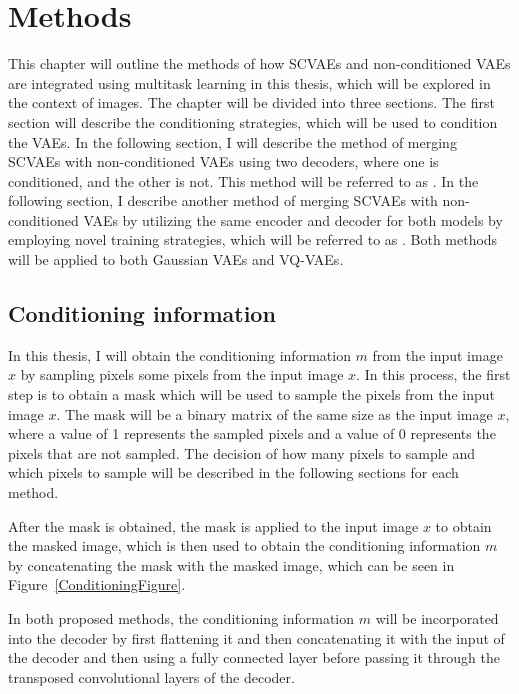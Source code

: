 \chapter{Methods}

This chapter will outline the methods of how SCVAEs and non-conditioned VAEs are
integrated using multitask learning in this thesis, which will be explored in
the context of images. The chapter will be divided into three sections. The first
section will describe the conditioning strategies, which will be used to
condition the VAEs. In the following section, I will describe the method of
merging SCVAEs with non-conditioned VAEs using two decoders, where one is
conditioned, and the other is not. This method will be referred to as
. In the following section, I describe another method of merging
SCVAEs with non-conditioned VAEs by utilizing the same encoder and decoder for
both models by employing novel training strategies, which will be referred to
as . Both methods will be applied to both Gaussian VAEs and VQ-VAEs.

\section{Conditioning information}

In this thesis, I will obtain the conditioning information $m$ from the input
image $x$ by sampling pixels some pixels from the input image $x$. In this
process, the first step is to obtain a mask which will be used to sample
the pixels from the input image $x$. The mask will be a binary matrix of the
same size as the input image $x$, where a value of 1 represents the sampled
pixels and a value of 0 represents the pixels that are not sampled. The
decision of how many pixels to sample and which pixels to sample will be described
in the following sections for each method.

After the mask is obtained, the mask is applied to the input image $x$ to
obtain the masked image, which is then used to obtain the conditioning
information $m$ by concatenating the mask with the masked image, which can be
seen in Figure~\ref{ConditioningFigure}.

In both proposed methods, the conditioning information $m$ will be incorporated
into the decoder by first flattening it and then concatenating it with the input of the decoder and then using a fully connected layer before passing it through the transposed convolutional layers of the decoder.


